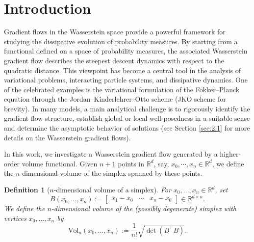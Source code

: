 \documentclass[11pt,reqno]{amsart}
\numberwithin{figure}{section}
\newcommand{\bbr}{\mathbb R}
\newtheorem{definition}{Definition}[section]
\begin{document}
 


\makeatletter
{}
\makeatother








\date{\today}

\maketitle





  
\section{Introduction}
\setcounter{equation}{0}




Gradient flows in the Wasserstein space provide a powerful framework for studying the dissipative evolution of probability measures. By starting from a functional defined on  a space of probability measures, the associated Wasserstein gradient flow describes the steepest descent dynamics with respect to the quadratic distance. This viewpoint has become a central tool in the analysis of variational problems,
interacting particle systems, and dissipative dynamics. One of the celebrated examples is the variational formulation of the Fokker--Planck equation through the Jordan--Kinderlehrer--Otto scheme \cite{JKO} (JKO scheme for brevity). In many models, a main analytical challenge is to rigorously  identify the gradient flow structure, establish global or local well-posedness in a suitable sense and determine the asymptotic behavior of solutions (see Section \ref{sec:2.1} for more details on the Wasserstein gradient flows). \newline


In this work, we investigate a Wasserstein gradient flow generated by a higher-order volume functional. Given $n+1$ points in $\bbr^d$, say, $x_0,\cdots,x_n \in \bbr^d$, we define the $n$-dimensional volume of the simplex spanned by these points.
\begin{definition}[$n$-dimensional volume of a simplex] \label{volume}
	For $x_0,\dots,x_n\in\mathbb R^d$, set
	\[
	B(x_0,\dots,x_n)
	:=
	\begin{bmatrix}
		x_1-x_0 & \cdots & x_n-x_0
	\end{bmatrix}
	\in\mathbb R^{d\times n}.
	\]
	We define the $n$-dimensional volume of the (possibly degenerate) simplex with vertices $x_0,\dots,x_n$ by
	\[
	\mathrm{Vol}_n(x_0,\dots,x_n)
	:=
	\frac{1}{n!}\sqrt{\det (B^\top B)}.
	\]
\end{definition}
\end{document}
